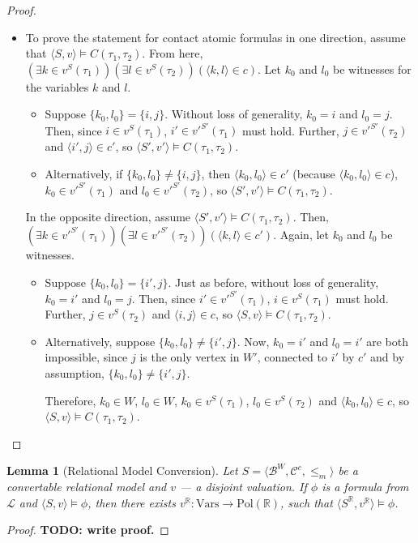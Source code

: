 \documentclass{article}
\newtheorem*{lemma}{Lemma}
\newcommand{\R}{\mathbb{R}}
\newcommand{\B}{\mathcal{B}}
\newcommand{\lang}{\mathcal{L}}
\newcommand{\Vars}{\text{Vars}}
\newcommand{\Pol}{\text{Pol}}
\newcommand{\lcont}{C}
\begin{document}
\begin{proof}
\begin{itemize}
\begin{itemize}
    \end{itemize}
  \item To prove the statement for contact atomic formulas in one direction, assume that $\langle S, v \rangle \models \lcont(\tau_1, \tau_2)$. From here, $(\exists k \in v^S(\tau_1))(\exists l \in v^S(\tau_2))(\langle k, l \rangle \in c)$.
    Let $k_0$ and $l_0$ be witnesses for the variables $k$ and $l$.
    \begin{itemize}
    \item Suppose $\{k_0, l_0\} = \{i, j\}$. Without loss of generality, $k_0 = i$ and $l_0 = j$. Then, since $i \in v^S(\tau_1)$, $i' \in v'^{S'}(\tau_1)$ must hold. Further, $j \in v'^{S'}(\tau_2)$ and $\langle i', j \rangle \in c'$, so $\langle S', v' \rangle \models \lcont(\tau_1, \tau_2)$.
    \item Alternatively, if $\{k_0, l_0\} \neq \{i, j\}$, then $\langle k_0, l_0 \rangle \in c'$ (because $\langle k_0, l_0 \rangle \in c$), $k_0 \in v'^{S'}(\tau_1)$ and $l_0 \in v'^{S'}(\tau_2)$, so $\langle S', v' \rangle \models \lcont(\tau_1, \tau_2)$.
    \end{itemize}
    In the opposite direction, assume $\langle S', v' \rangle \models \lcont(\tau_1, \tau_2)$. Then, $(\exists k \in v'^{S'}(\tau_1))(\exists l \in v'^{S'}(\tau_2))(\langle k, l \rangle \in c')$. Again, let $k_0$ and $l_0$ be witnesses.
    \begin{itemize}
    \item Suppose $\{k_0, l_0\} = \{i', j\}$. Just as before, without loss of generality, $k_0 = i'$ and $l_0 = j$. Then, since $i' \in v'^{S'}(\tau_1)$, $i \in v^S(\tau_1)$ must hold. Further, $j \in v^S(\tau_2)$ and $\langle i, j \rangle \in c$, so $\langle S, v \rangle \models \lcont(\tau_1, \tau_2)$.
    \item
      Alternatively, suppose $\{k_0, l_0\} \neq \{i', j\}$. Now, $k_0 = i'$ and $l_0 = i'$ are both impossible, since $j$ is the only vertex in $W'$, connected to $i'$ by $c'$ and by assumption, $\{k_0, l_0\} \neq \{i', j\}$.

      Therefore, $k_0 \in W$, $l_0 \in W$, $k_0 \in v^S(\tau_1)$, $l_0 \in v^S(\tau_2)$ and $\langle k_0, l_0 \rangle \in c$, so $\langle S, v \rangle \models \lcont(\tau_1, \tau_2)$.
    \end{itemize}
\end{itemize}
\end{proof}

\begin{lemma}[Relational Model Conversion]
  Let $S = \langle \B^W, \mathcal{C}^c, \leq_m \rangle$ be a convertable relational model and $v$ --- a disjoint valuation. If $\phi$ is a formula from $\lang$ and $\langle S, v \rangle \models \phi$, then there exists $v^\R: \Vars \rightarrow \Pol(\R)$, such that $\langle S^\R, v^\R \rangle \models \phi$.
\end{lemma}
\begin{proof}
  \textbf{TODO: write proof.}
\end{proof}
\end{document}
